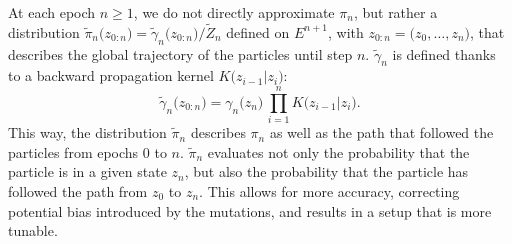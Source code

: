 \documentclass[11pt,a4paper]{article}
\begin{document}
	At each epoch $n\geq1$, we do not directly approximate $\pi_{n}$, but rather a distribution $\tilde{\pi}_{n}\big(z_{0:n}\big) = \tilde{\gamma}_{n}\big(z_{0:n}\big)/\tilde{Z}_{n}$ defined on $E^{n+1}$, with $z_{0:n} = \big(z_{0},\ldots,z_{n}\big)$, that describes the global trajectory of the particles until step $n$. $\tilde{\gamma}_{n}$ is defined thanks to a backward propagation kernel $K\big(z_{i-1}\vert z_{i}\big)$:
	\begin{equation}
		\tilde{\gamma}_{n}\big(z_{0:n}\big) = \gamma_{n}\big(z_{n}\big)\,\prod_{i=1}^{n} K\big(z_{i-1}\vert z_{i}\big).
	\end{equation}
	This way, the distribution $\tilde{\pi}_{n}$ describes $\pi_{n}$ as well as the path that followed the particles from epochs $0$ to $n$. $\tilde{\pi}_{n}$ evaluates not only the probability that the particle is in a given state $z_{n}$, but also the probability that the particle has followed the path from $z_{0}$ to $z_{n}$. This allows for more accuracy, correcting potential bias introduced by the mutations, and results in a setup that is more tunable.
	
\end{document}
